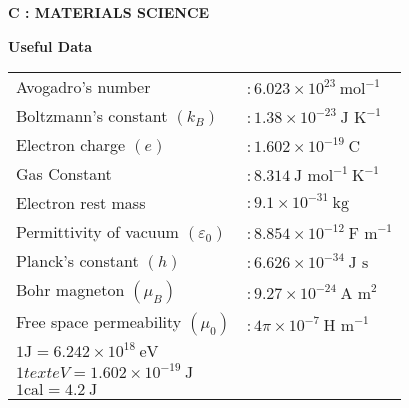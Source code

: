 \documentclass[journal,12pt,onecolumn]{IEEEtran}
\theoremstyle{remark}
\begin{document}
\begin{center}
    \textbf{\Large C : MATERIALS SCIENCE}
\end{center}

\begin{center}
    \textbf{Useful Data}
\end{center}

\begin{tabular}{@{}l l@{}}
    Avogadro's number & \( : 6.023 \times 10^{23} \ \text{mol}^{-1}\) \\
    Boltzmann's constant \((k_B)\) & \( : 1.38 \times 10^{-23} \ \text{J K}^{-1}\) \\
    Electron charge \((e)\) & \( : 1.602 \times 10^{-19} \ \text{C}\) \\
    Gas Constant & \( : 8.314 \ \text{J mol}^{-1} \ \text{K}^{-1}\) \\
    Electron rest mass & \( : 9.1 \times 10^{-31} \ \text{kg}\) \\
    Permittivity of vacuum \((\varepsilon_0)\) & \( : 8.854 \times 10^{-12} \ \text{F m}^{-1}\) \\
    Planck's constant \((h)\) & \( : 6.626 \times 10^{-34} \ \text{J s}\) \\
    Bohr magneton \((\mu_B)\) & \( : 9.27 \times 10^{-24} \ \text{A m}^2\) \\
    Free space permeability \((\mu_0)\) & \( : 4 \pi \times 10^{-7} \ \text{H m}^{-1}\) \\
    \( 1 \text{J} = 6.242 \times 10^{18} \ \text{eV}\) \\
    \(1 text{eV} = 1.602 \times 10^{-19} \ \text{J}\) \\
    \(1 \text{cal} = 4.2 \ \text{J}\) \\
\end{tabular}
\end{document}
